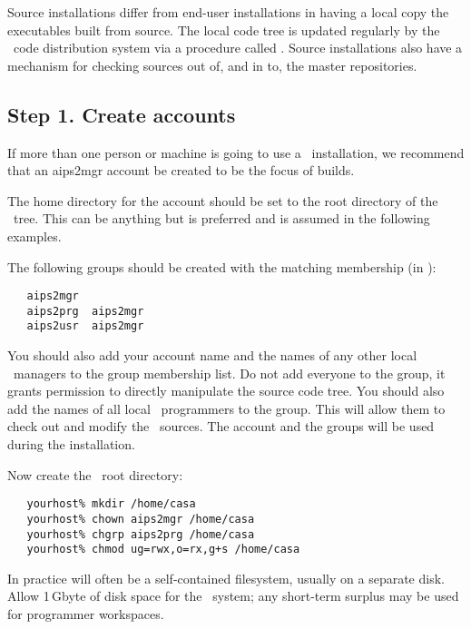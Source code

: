 Source installations differ from end-user installations in having a local
copy the executables built from source.
The local code tree is updated regularly by the \aipspp\ code
distribution system via a procedure called .  Source
installations also have a mechanism for checking sources out of, and in to,
the master \svn repositories.

\subsection*{Step 1. Create \casa accounts}

If more than one person or machine is going to use a \casa\ installation, we recommend that
an aips2mgr account be created to be the focus of
\casa builds.

\noindent
The home directory for the account should be set to the root
directory of the \aipspp\ tree.  This can be anything but  is
preferred and is assumed in the following examples.

The following groups should be created with the matching membership
(in ):

\begin{verbatim}
   aips2mgr   
   aips2prg  aips2mgr
   aips2usr  aips2mgr
\end{verbatim}

\noindent
You should also add your account name and the names of any other local
\aipspp\ managers to the  group membership list.  Do not add
everyone to the  group, it grants permission to directly
manipulate the source code tree.  You should also add the names of all local
\aipspp\ programmers to the  group.  This will allow them to
check out and modify the \aipspp\ sources.  The  account and the
  groups will be used during the installation.

Now create the \aipspp\ root directory:

\begin{verbatim}
   yourhost% mkdir /home/casa
   yourhost% chown aips2mgr /home/casa
   yourhost% chgrp aips2prg /home/casa
   yourhost% chmod ug=rwx,o=rx,g+s /home/casa
\end{verbatim}

\noindent
In practice  will often be a self-contained filesystem, usually
on a separate disk.  Allow 1\,Gbyte of disk space for the \aipspp\ system; any
short-term surplus may be used for programmer workspaces.

